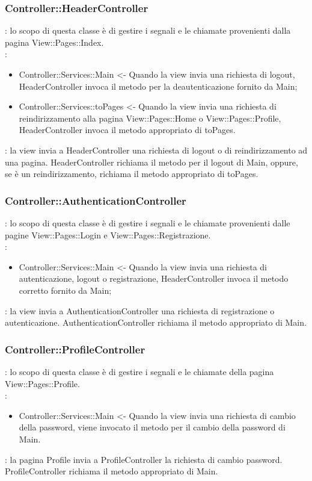 {	\subsubsection{Controller::\-HeaderController}{
		\textbf{\tipo}: lo scopo di questa classe è di gestire i segnali e le chiamate provenienti dalla pagina View::\-Pages::\-Index.\\	
		\textbf{\relaz}:
		\begin{itemize}
			\item Controller::\-Services::\-Main <- Quando la view invia una richiesta di logout, HeaderController invoca il metodo per la deautenticazione fornito da Main;
			\item Controller::\-Services::\-toPages <- Quando la view invia una richiesta di reindirizzamento alla pagina View::\-Pages::\-Home o View::\-Pages::\-Profile, HeaderController invoca il metodo appropriato di toPages.
		\end{itemize}
		\textbf{\interfacce}: la view invia a HeaderController una richiesta di logout o di reindirizzamento ad una pagina. HeaderController richiama il metodo per il logout di Main, oppure, se è un reindirizzamento, richiama il metodo appropriato di toPages.
	}

	\subsubsection{Controller::\-AuthenticationController}{
		\textbf{\tipo}: lo scopo di questa classe è di gestire i segnali e le chiamate provenienti dalle pagine View::\-Pages::\-Login e View::\-Pages::\-Registrazione.\\	
		\textbf{\relaz}:
		\begin{itemize}
			\item Controller::\-Services::\-Main <- Quando la view invia una richiesta di autenticazione, logout o registrazione, HeaderController invoca il metodo corretto fornito da Main;
		\end{itemize}
		\textbf{\interfacce}: la view invia a AuthenticationController una richiesta di registrazione o autenticazione. AuthenticationController richiama il metodo appropriato di Main.
	}
			
	\subsubsection{Controller::\-ProfileController}{
		\textbf{\tipo}: lo scopo di questa classe è di gestire i segnali e le chiamate della pagina View::\-Pages::\-Profile.\\	
		\textbf{\relaz}:
		\begin{itemize}
			\item Controller::\-Services::\-Main <- Quando la view invia una richiesta di cambio della password, viene invocato il metodo per il cambio della password di Main.
		\end{itemize}
		\textbf{\interfacce}: la pagina Profile invia a ProfileController la richiesta di cambio password. ProfileController richiama il metodo appropriato di Main.
	}

}
